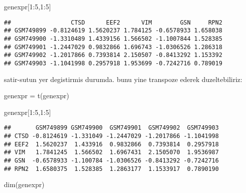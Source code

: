 \documentclass[
]{book}
\newenvironment{Shaded}{\begin{snugshade}}{\end{snugshade}}
\newcommand{\DecValTok}[1]{\textcolor[rgb]{0.00,0.00,0.81}{#1}}
\newcommand{\FunctionTok}[1]{\textcolor[rgb]{0.00,0.00,0.00}{#1}}
\newcommand{\NormalTok}[1]{#1}
\newcommand{\OtherTok}[1]{\textcolor[rgb]{0.56,0.35,0.01}{#1}}
\newcommand{\SpecialCharTok}[1]{\textcolor[rgb]{0.00,0.00,0.00}{#1}}
\begin{document}
\begin{Shaded}
\begin{Highlighting}[]
\NormalTok{genexpr[}\DecValTok{1}\SpecialCharTok{:}\DecValTok{5}\NormalTok{,}\DecValTok{1}\SpecialCharTok{:}\DecValTok{5}\NormalTok{]}
\end{Highlighting}
\end{Shaded}

\begin{verbatim}
##                 CTSD      EEF2      VIM        GSN     RPN2
## GSM749899 -0.8124619 1.5620237 1.784125 -0.6578933 1.658038
## GSM749900 -1.3310489 1.4339156 1.566502 -1.1007844 1.528385
## GSM749901 -1.2447029 0.9832866 1.696743 -1.0306526 1.286318
## GSM749902 -1.2017866 0.7393814 2.150507 -0.8413292 1.153392
## GSM749903 -1.1041998 0.2957918 1.953699 -0.7242716 0.789019
\end{verbatim}

satir-sutun yer degistirmis durumda. bunu yine transpoze ederek duzeltebiliriz:

\begin{Shaded}
\begin{Highlighting}[]
\NormalTok{genexpr }\OtherTok{=} \FunctionTok{t}\NormalTok{(genexpr)}
\end{Highlighting}
\end{Shaded}

\begin{Shaded}
\begin{Highlighting}[]
\NormalTok{genexpr[}\DecValTok{1}\SpecialCharTok{:}\DecValTok{5}\NormalTok{,}\DecValTok{1}\SpecialCharTok{:}\DecValTok{5}\NormalTok{]}
\end{Highlighting}
\end{Shaded}

\begin{verbatim}
##       GSM749899 GSM749900  GSM749901  GSM749902  GSM749903
## CTSD -0.8124619 -1.331049 -1.2447029 -1.2017866 -1.1041998
## EEF2  1.5620237  1.433916  0.9832866  0.7393814  0.2957918
## VIM   1.7841245  1.566502  1.6967431  2.1505070  1.9536987
## GSN  -0.6578933 -1.100784 -1.0306526 -0.8413292 -0.7242716
## RPN2  1.6580375  1.528385  1.2863177  1.1533917  0.7890190
\end{verbatim}

\begin{Shaded}
\begin{Highlighting}[]
\FunctionTok{dim}\NormalTok{(genexpr)}
\end{Highlighting}
\end{Shaded}
\end{document}
